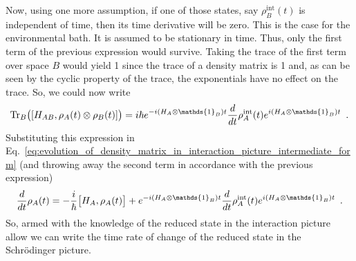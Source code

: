\documentclass{article}
\begin{document}
Now, using one more assumption, if one of those states, say $
\rho^{\textrm{int}}_{B}(t) $ is independent of time, then its time derivative
will be zero. This is the case for the environmental bath. It is assumed to be
stationary in time. Thus, only the first term of the previous expression would
survive. Taking the trace of the first term over space $ B $ would yield 1 since
the trace of a density matrix is 1 and, as can be seen by the cyclic property of
the trace, the exponentials have no effect on the trace. So, we could now write
\begin{equation}
   \Tr_{B} \bigl( \left[ H_{AB}, \rho_{A}(t) \otimes \rho_{B}(t) \right] \bigr)
   =
   i \hbar
   e^{- i (H_{A} \otimes \mathds{1}_{B}) t }
   \frac{d}{dt} \rho^{\textrm{int}}_{A}(t)
   e^{i (H_{A} \otimes \mathds{1}_{B}) t } \enskip .
\end{equation}
Substituting this expression in
Eq.~\ref{eq:evolution_of_density_matrix_in_interaction_picture_intermediate_form}
(and throwing away the second term in accordance with the previous expression)
\begin{equation}
\frac{d}{dt} \rho_{A}(t) = -\frac{i}{\hbar} \bigl[  H_{A} , \rho_{A}(t) \bigr]
+ e^{- i (H_{A} \otimes \mathds{1}_{B}) t }
   \frac{d}{dt} \rho^{\textrm{int}}_{A}(t)
   e^{i (H_{A} \otimes \mathds{1}_{B}) t } \enskip.
   \label{eq:time_evolution_of_schrodinger_state_in_terms_of_interaction_state}
\end{equation}
So, armed with the knowledge of the reduced state in the interaction picture
allow we can write the time rate of change of the reduced state in the
Schr\"{o}dinger picture.



\end{document}
